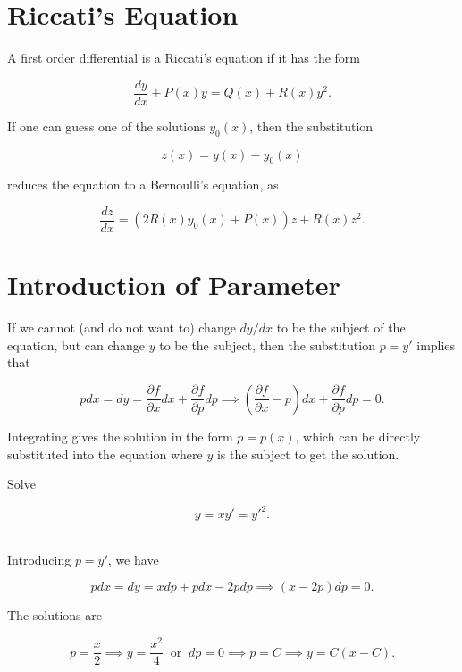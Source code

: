 \documentclass[english,a4paper,12pt]{report}
\begin{document}
\section{Riccati's Equation}

A first order differential is a Riccati's equation if it has the form

\begin{equation}
    \frac{dy}{dx} + P(x)y = Q(x) + R(x)y^2.
\end{equation}

If one can guess one of the solutions \(y_0 (x)\), then the substitution

\begin{equation}
    z(x) = y(x) - y_0(x)
\end{equation}

reduces the equation to a Bernoulli's equation, as

\begin{equation}
    \frac{dz}{dx} = (2R(x)y_0 (x)+P(x))z + R(x)z^2. 
\end{equation}

\section{Introduction of Parameter}

If we cannot (and do not want to) change \( dy /dx\) to be the subject of the equation, but can change \(y\) to be the subject, then the substitution \(p =y'\) implies that 

\begin{equation}
    pdx = dy = \frac{\partial f}{\partial x} dx + \frac{\partial f}{\partial p} dp \implies \left( \frac{\partial f}{\partial x} -p \right)dx + \frac{\partial f}{\partial p} dp = 0.
\end{equation}

Integrating gives the solution in the form \(p = p(x)\), which can be directly substituted into the equation where \(y\) is the subject to get the solution.

{Solve

\begin{equation}
    y = xy'=y'^2.
\end{equation}~
}
{Introducing \(p = y'\), we have

\begin{equation}
    pdx = dy = xdp + pdx - 2pdp \implies (x-2p)dp = 0.
\end{equation}

The solutions are 

\begin{equation}
    p = \frac{x}{2} \implies y = \frac{x^2}{4} ~\text { or }~ dp = 0 \implies p = C \implies y = C(x-C).  
\end{equation}~
} 
\end{document}
